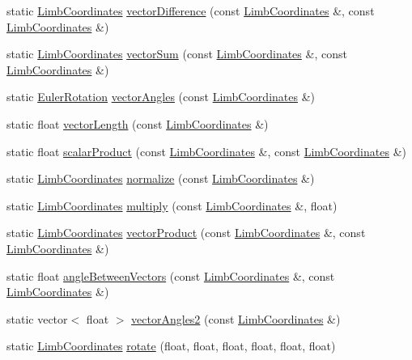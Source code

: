 \begin{DoxyCompactItemize}
\item 
static \hyperlink{structLimbCoordinates}{LimbCoordinates} \hyperlink{classHelper_abc864cbfae3b0021fec149776b4d2ce0}{vectorDifference} (const \hyperlink{structLimbCoordinates}{LimbCoordinates} \&, const \hyperlink{structLimbCoordinates}{LimbCoordinates} \&)
\item 
static \hyperlink{structLimbCoordinates}{LimbCoordinates} \hyperlink{classHelper_af01207ddd47379314a7b9f88ff2b656d}{vectorSum} (const \hyperlink{structLimbCoordinates}{LimbCoordinates} \&, const \hyperlink{structLimbCoordinates}{LimbCoordinates} \&)
\item 
static \hyperlink{structEulerRotation}{EulerRotation} \hyperlink{classHelper_ad2e619d55eeb5f2e727cb3fff1f16484}{vectorAngles} (const \hyperlink{structLimbCoordinates}{LimbCoordinates} \&)
\item 
static float \hyperlink{classHelper_a9d5e7130ec677185eed512648cea7753}{vectorLength} (const \hyperlink{structLimbCoordinates}{LimbCoordinates} \&)
\item 
static float \hyperlink{classHelper_a428aa2b6e98de3265160839b8a9d90dd}{scalarProduct} (const \hyperlink{structLimbCoordinates}{LimbCoordinates} \&, const \hyperlink{structLimbCoordinates}{LimbCoordinates} \&)
\item 
static \hyperlink{structLimbCoordinates}{LimbCoordinates} \hyperlink{classHelper_a28f8794505ffca7525c950595a380035}{normalize} (const \hyperlink{structLimbCoordinates}{LimbCoordinates} \&)
\item 
static \hyperlink{structLimbCoordinates}{LimbCoordinates} \hyperlink{classHelper_ae7553e9c0e8f9c926a5f2d054d4ed99d}{multiply} (const \hyperlink{structLimbCoordinates}{LimbCoordinates} \&, float)
\item 
static \hyperlink{structLimbCoordinates}{LimbCoordinates} \hyperlink{classHelper_a9a8b68baa1c84bf3886489e76c7d9951}{vectorProduct} (const \hyperlink{structLimbCoordinates}{LimbCoordinates} \&, const \hyperlink{structLimbCoordinates}{LimbCoordinates} \&)
\item 
static float \hyperlink{classHelper_a8247553942b803f8a9a9598c5543c4a2}{angleBetweenVectors} (const \hyperlink{structLimbCoordinates}{LimbCoordinates} \&, const \hyperlink{structLimbCoordinates}{LimbCoordinates} \&)
\item 
static vector$<$ float $>$ \hyperlink{classHelper_a0437d2944cfd6dd6b446fe14940b0518}{vectorAngles2} (const \hyperlink{structLimbCoordinates}{LimbCoordinates} \&)
\item 
static \hyperlink{structLimbCoordinates}{LimbCoordinates} \hyperlink{classHelper_a2255b24c7cf22a501f2edff436294349}{rotate} (float, float, float, float, float, float)

\end{DoxyCompactItemize}
